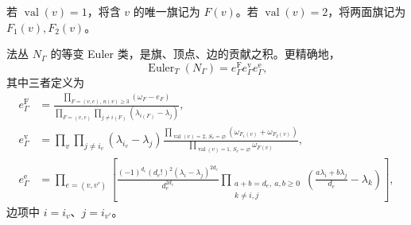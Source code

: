 若 $\operatorname{val}(v)=1$，将含 $v$ 的唯一旗记为 $F(v)$。若 $\operatorname{val}(v)=2$，将两面旗记为 $F_1(v),F_2(v)$。
\begin{theorem}\label{thm:fixed-graph-normal-euler}
法丛 $N_\Gamma$ 的等变 Euler 类，是旗、顶点、边的贡献之积。更精确地，
\[
\operatorname{Euler}_T(N_\Gamma)=e_\Gamma^{\mathrm F}e_\Gamma^{\mathrm v}e_\Gamma^{\mathrm e},
\]
其中三者定义为
\[
\begin{aligned}
e_\Gamma^{\mathrm F}&=\frac{\prod_{F=(v,e),\,n(v)\ge3}(\omega_F-e_F)}
{\prod_{F=(v,e)}\prod_{j\ne i(F)}(\lambda_{i(F)}-\lambda_j)},\\
e_\Gamma^{\mathrm v}&=\prod_v\prod_{j\ne i_v}(\lambda_{i_v}-\lambda_j)
\frac{\prod_{\operatorname{val}(v)=2,\,S_v=\varnothing}(\omega_{F_1(v)}+\omega_{F_2(v)})}
{\prod_{\operatorname{val}(v)=1,\,S_v=\varnothing}\omega_{F(v)}},\\
e_\Gamma^{\mathrm e}&=\prod_{e=(v,v')}\left[
\frac{(-1)^{d_e}(d_e!)^2(\lambda_i-\lambda_j)^{2d_e}}{d_e^{2d_e}}
\prod_{\substack{a+b=d_e,\ a,b\ge0\\k\ne i,j}}
\left(\frac{a\lambda_i+b\lambda_j}{d_e}-\lambda_k\right)\right],
\end{aligned}
\]
边项中 $i=i_v$、$j=i_{v'}$。
\end{theorem}
